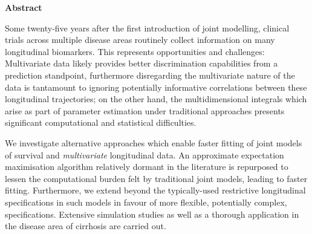 \begin{center}
{\Huge \bf Abstract}
\end{center}
\noindent

    Some twenty-five years after the first introduction of joint modelling, clinical trials across multiple disease areas routinely collect information on many longitudinal biomarkers. This represents opportunities and challenges: Multivariate data likely provides better discrimination capabilities from a prediction standpoint, furthermore disregarding the multivariate nature of the data is tantamount to ignoring potentially informative correlations between these longitudinal trajectories; on the other hand, the multidimensional integrals which arise as part of parameter estimation under traditional approaches presents significant computational and statistical difficulties.

    We investigate alternative approaches which enable faster fitting of joint models of survival and \textit{multivariate} longitudinal data. An approximate expectation maximisation algorithm relatively dormant in the literature is repurposed to lessen the computational burden felt by traditional joint models, leading to faster fitting. Furthermore, we extend beyond the typically-used restrictive longitudinal specifications in such models in favour of more flexible, potentially complex, specifications. Extensive simulation studies as well as a thorough application in the disease area of cirrhosis are carried out.

\thispagestyle{empty}
\restoregeometry